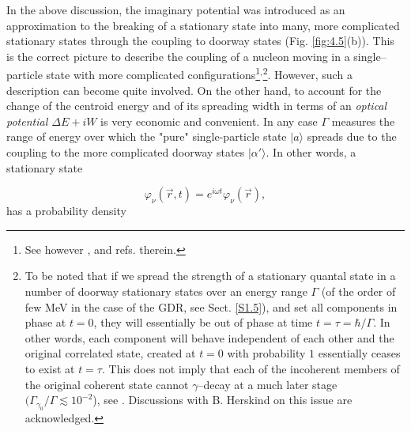 In the above discussion, the imaginary potential was introduced as an approximation to  the breaking of a stationary state into many, more complicated stationary states through the coupling to doorway states (Fig. \ref{fig:4.5}(b)). This is the  correct picture to describe the coupling of a nucleon moving in a single--particle state with more complicated configurations\footnote{See however \cite{Caldeira:81}, \cite{Caldeira:83} and refs. therein.}$^,$\footnote{To be noted that if we spread the strength of a stationary quantal state in a number of doorway stationary states over an energy range $\Gamma$ (of the order of few MeV in the case of the GDR, see Sect. \ref{S1.5}), and set all components in phase at $t=0$, they will essentially be out of phase at time $t=\tau = \hbar/\Gamma$. In other words, each component will behave independent of each other and the original correlated state, created at $t=0$ with probability $1$ essentially ceases to exist at $t=\tau$. This does not imply that each of the incoherent members of the original coherent state cannot $\gamma$--decay at a much later stage $(\Gamma_{\gamma_0}/\Gamma\lesssim10^{-2}$), see \cite{Bortignon:98}. Discussions with B. Herskind on this issue are acknowledged.}. However, such a description can become quite involved. On the other hand, to account for the change of the centroid energy and of its spreading width in terms of an {\it optical potential $\Delta E + iW$} is very economic and convenient. In any case $\Gamma$ measures the range of energy over which the "pure" single-particle state $|a\rangle$ spreads due to the coupling to the more complicated doorway states $|\alpha'\rangle$. In other words, a stationary state

\begin{equation}
\varphi_{\nu}(\vec{r},t) = e^{i\omega t} \varphi_{\nu}(\vec{r}) ,
\label{eqn:43}
\end{equation}
has a probability density

